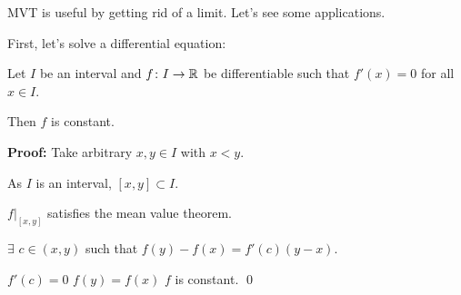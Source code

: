 \documentclass[10pt,aspectratio=169]{beamer}
\begin{document}
\begin{frame}
MVT is useful by getting rid of a limit.  Let's see some applications.

\medskip
\pause

First, let's solve a differential equation:

\begin{proposition}
Let $I$ be an interval and
$f \colon I \to {\mathbb{R}}$ be differentiable such that $f'(x) = 0$
for all $x \in I$.

\pause
Then $f$ is constant.
\end{proposition}

\pause
\textbf{Proof:}
Take arbitrary $x,y \in I$ with $x < y$.

\pause
\medskip

As $I$ is an interval, $[x,y] \subset I$.

\pause
\medskip

$f|_{[x,y]}$ satisfies the mean value theorem.

\pause
\medskip

\thus \quad $\exists$ $c \in (x,y)$ such that
$\displaystyle f(y)-f(x) = f'(c)(y-x)$.

\pause
\medskip

$f'(c) = 0$
\pause
\wthus $f(y) = f(x)$
\pause
\wthus $f$ is constant.
\qed
\end{frame}
\end{document}
